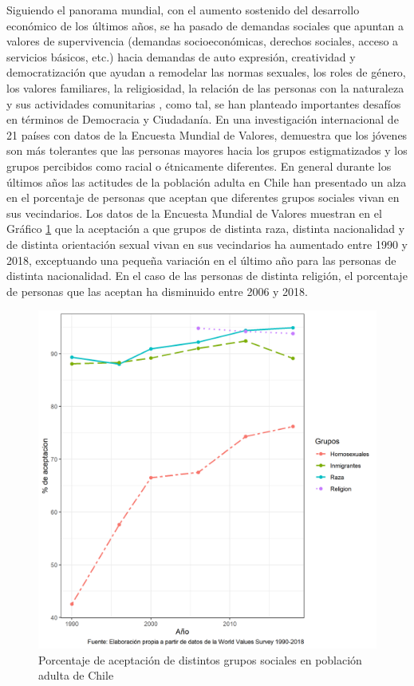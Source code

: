 \documentclass[12pt,twoside]{templates/facsothesis}
\begin{document}
Siguiendo el panorama mundial, con el aumento sostenido del desarrollo económico de los últimos años, se ha pasado de demandas sociales que apuntan a valores de supervivencia (demandas socioeconómicas, derechos sociales, acceso a servicios básicos, etc.) hacia demandas de auto expresión, creatividad y democratización que ayudan a remodelar las normas sexuales, los roles de género, los valores familiares, la religiosidad, la relación de las personas con la naturaleza y sus actividades comunitarias \citep{inglehart_Modernization_2001}, como tal, se han planteado importantes desafíos en términos de Democracia y Ciudadanía. En una investigación internacional de 21 países con datos de la Encuesta Mundial de Valores, \citet{vala_youth_2010} demuestra que los jóvenes son más tolerantes que las personas mayores hacia los grupos estigmatizados y los grupos percibidos como racial o étnicamente diferentes. En general durante los últimos años las actitudes de la población adulta en Chile han presentado un alza en el porcentaje de personas que aceptan que diferentes grupos sociales vivan en sus vecindarios. Los datos de la Encuesta Mundial de Valores \citep{haerpfer_world_2021} muestran en el Gráfico \ref{fig:aceptacion-wvs} que la aceptación a que grupos de distinta raza, distinta nacionalidad y de distinta orientación sexual vivan en sus vecindarios ha aumentado entre 1990 y 2018, exceptuando una pequeña variación en el último año para las personas de distinta nacionalidad. En el caso de las personas de distinta religión, el porcentaje de personas que las aceptan ha disminuido entre 2006 y 2018.

\begin{figure}[H]

{\centering \includegraphics[width=1\linewidth]{images/aceptacion_wvs} 

}

\caption{Porcentaje de aceptación de distintos grupos sociales en población adulta de Chile}\label{fig:aceptacion-wvs}
\end{figure}
\end{document}
